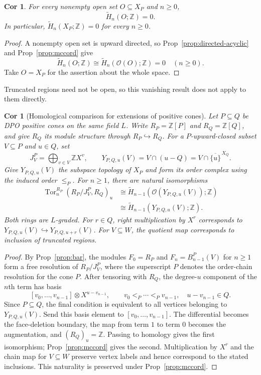 \documentclass[10pt,letterpaper]{amsart}
\numberwithin{equation}{section}
\newtheorem{cor}[thm]{Cor}
\theoremstyle{definition}
\newcommand{\Z}{\mathbb Z}
\newcommand{\Tor}{\operatorname{Tor}}
\newcommand{\ord}{\mathcal O}
\begin{document}
\begin{cor}\label{cor:global-singular}
For every nonempty open set $O\subseteq X_P$ and $n\ge0$,
\[
\widetilde H_n(O;\Z)=0.
\]
In particular, $\widetilde H_n(X_P;\Z)=0$ for every $n\ge0$.
\end{cor}
\begin{proof}
A nonempty open set is upward directed, so Prop~\ref{prop:directed-acyclic} and Prop~\ref{prop:mccord} give
\[
\widetilde H_n(O;\Z)\cong\widetilde H_n(\ord(O);\Z)=0\quad(n\ge0).
\]
Take $O=X_P$ for the assertion about the whole space.
\end{proof}

Truncated regions need not be open, so this vanishing result does not apply to them directly.

\begin{cor}[Homological comparison for extensions of positive cones]\label{cor:extension-comparison}
Let $P\subseteq Q$ be DPO positive cones on the same field $L$. Write $R_P=\Z[P]$ and $R_Q=\Z[Q]$, and give $R_Q$ its module structure through $R_P\hookrightarrow R_Q$.
For a $P$-upward-closed subset $V\subseteq P$ and $u\in Q$, set
\[
J_V^P=\bigoplus_{v\in V}\Z X^v,\qquad
Y_{P,Q,u}(V)=V\cap(u-Q)=V\cap\overline{\{u\}}^{\,X_Q}.
\]
Give $Y_{P,Q,u}(V)$ the subspace topology of $X_P$ and form its order complex using the induced order $\le_P$. For $n\ge1$, there are natural isomorphisms
\begin{align*}
\Tor_n^{R_P}(R_P/J_V^P,R_Q)_u
&\cong\widetilde H_{n-1}(\ord(Y_{P,Q,u}(V));\Z)\\
&\cong\widetilde H_{n-1}(Y_{P,Q,u}(V);\Z).
\end{align*}
Both rings are $L$-graded. For $r\in Q$, right multiplication by $X^r$ corresponds to $Y_{P,Q,u}(V)\hookrightarrow Y_{P,Q,u+r}(V)$. For $V\subseteq W$, the quotient map corresponds to inclusion of truncated regions.
\end{cor}
\begin{proof}
By Prop~\ref{prop:bar}, the modules $F_0=R_P$ and $F_n=B_{n-1}^P(V)$ for $n\ge1$ form a free resolution of $R_P/J_V^P$, where the superscript $P$ denotes the order-chain resolution for the cone $P$.
After tensoring with $R_Q$, the degree-$u$ component of the $n$th term has basis
\[
[v_0,\ldots,v_{n-1}]\otimes X^{u-v_{n-1}},\qquad
v_0<_P\cdots<_Pv_{n-1},\quad u-v_{n-1}\in Q.
\]
Since $P\subseteq Q$, the final condition is equivalent to all vertices belonging to $Y_{P,Q,u}(V)$.
Send this basis element to $[v_0,\ldots,v_{n-1}]$. The differential becomes the face-deletion boundary, the map from term $1$ to term $0$ becomes the augmentation, and $(R_Q)_u=\Z$. Passing to homology gives the first isomorphism; Prop~\ref{prop:mccord} gives the second.
Multiplication by $X^r$ and the chain map for $V\subseteq W$ preserve vertex labels and hence correspond to the stated inclusions. This naturality is preserved under Prop~\ref{prop:mccord}.
\end{proof}
\end{document}
